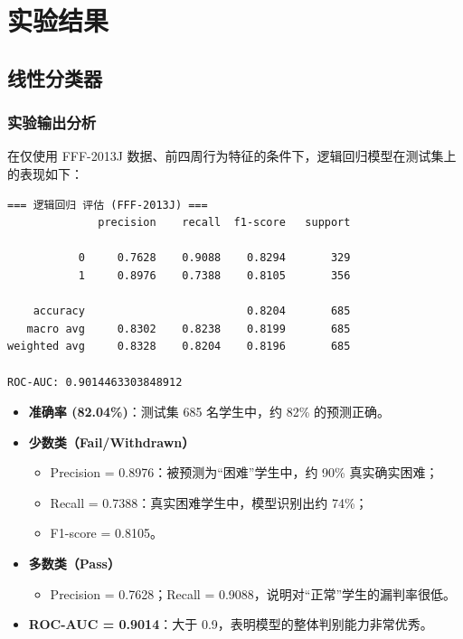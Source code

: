 \documentclass{SYSUReport}
\begin{document}
\section{实验结果}

\subsection{线性分类器}
\subsubsection{实验输出分析}
在仅使用 FFF-2013J 数据、前四周行为特征的条件下，逻辑回归模型在测试集上的表现如下：

\begin{verbatim}
=== 逻辑回归 评估 (FFF-2013J) ===
              precision    recall  f1-score   support

           0     0.7628    0.9088    0.8294       329
           1     0.8976    0.7388    0.8105       356

    accuracy                         0.8204       685
   macro avg     0.8302    0.8238    0.8199       685
weighted avg     0.8328    0.8204    0.8196       685

ROC-AUC: 0.9014463303848912
\end{verbatim}

\begin{itemize}
  \item \textbf{准确率 (82.04\%)}：测试集 685 名学生中，约 82\% 的预测正确。
  \item \textbf{少数类（Fail/Withdrawn）}  
    \begin{itemize}
      \item Precision = 0.8976：被预测为“困难”学生中，约 90\% 真实确实困难；  
      \item Recall = 0.7388：真实困难学生中，模型识别出约 74\%；  
      \item F1-score = 0.8105。  
    \end{itemize}
  \item \textbf{多数类（Pass）}  
    \begin{itemize}
      \item Precision = 0.7628；Recall = 0.9088，说明对“正常”学生的漏判率很低。  
    \end{itemize}
  \item \textbf{ROC-AUC = 0.9014}：大于 0.9，表明模型的整体判别能力非常优秀。
\end{itemize}
\end{document}
